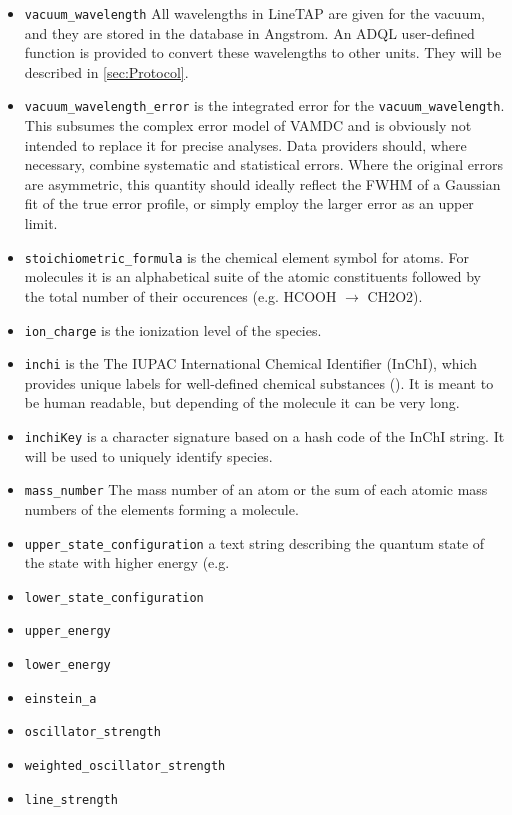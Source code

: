\documentclass[11pt,a4paper]{ivoa}
\begin{document}
\begin{itemize}
\item \texttt{vacuum\_wavelength}
All wavelengths in LineTAP are given for the vacuum,
and  they are stored in the database in
Angstrom.  An  ADQL user-defined function is provided to convert these
wavelengths to other units. They will be described in
\ref{sec:Protocol}.

\item \texttt{vacuum\_wavelength\_error} is the integrated error for the 
\texttt{vacuum\_wavelength}.  This subsumes the complex error model of
VAMDC and is obviously not intended to replace it for precise analyses.
Data providers should, where necessary, combine systematic and
statistical errors.  Where the original errors are asymmetric, this
quantity should ideally reflect the FWHM of a Gaussian fit of the true
error profile, or simply employ the larger error as an upper limit.

\item \texttt{stoichiometric\_formula} is the chemical element symbol
for atoms. For molecules it is an alphabetical suite of the atomic
constituents followed by the total number of their occurences (e.g.
HCOOH $\to$ CH2O2).

\item \texttt{ion\_charge} is the ionization level of the species.

\item \texttt{inchi} is the The IUPAC International Chemical Identifier
(InChI), which  provides unique labels for well-defined chemical
substances (\cite{INCHI}). It is meant to be human readable, but
depending of the molecule it can be very long.

\item \texttt{inchiKey} is a character signature based on a hash code of
the InChI string. It will be used to uniquely identify species.

\item \texttt{mass\_number} The mass number of an atom or the sum of
each atomic mass numbers of the elements forming a molecule.

\item \texttt{upper\_state\_configuration} a text string describing the
quantum state of the state with higher energy (e.g. 

\item \texttt{lower\_state\_configuration}
\item \texttt{upper\_energy}
\item \texttt{lower\_energy}

\item \texttt{einstein\_a}
\item \texttt{oscillator\_strength}
\item \texttt{weighted\_oscillator\_strength}
\item \texttt{line\_strength}

\end{itemize}
\end{document}
